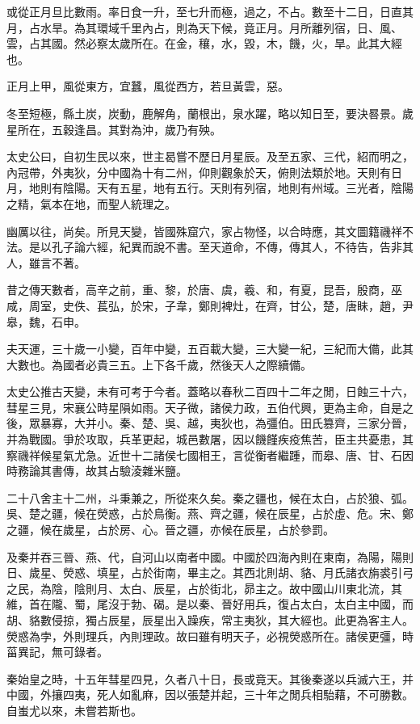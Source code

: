 或從正月旦比數雨。率日食一升，至七升而極，過之，不占。數至十二日，日直其月，占水旱。為其環域千里內占，則為天下候，竟正月。月所離列宿，日、風、雲，占其國。然必察太歲所在。在金，穰，水，毀，木，饑，火，旱。此其大經也。

正月上甲，風從東方，宜蠶，風從西方，若旦黃雲，惡。

冬至短極，縣土炭，炭動，鹿解角，蘭根出，泉水躍，略以知日至，要決晷景。歲星所在，五穀逢昌。其對為沖，歲乃有殃。

太史公曰，自初生民以來，世主曷嘗不歷日月星辰。及至五家、三代，紹而明之，內冠帶，外夷狄，分中國為十有二州，仰則觀象於天，俯則法類於地。天則有日月，地則有陰陽。天有五星，地有五行。天則有列宿，地則有州域。三光者，陰陽之精，氣本在地，而聖人統理之。

幽厲以往，尚矣。所見天變，皆國殊窟穴，家占物怪，以合時應，其文圖籍禨祥不法。是以孔子論六經，紀異而說不書。至天道命，不傳，傳其人，不待告，告非其人，雖言不著。

昔之傳天數者，高辛之前，重、黎，於唐、虞，羲、和，有夏，昆吾，殷商，巫咸，周室，史佚、萇弘，於宋，子韋，鄭則裨灶，在齊，甘公，楚，唐眛，趙，尹皋，魏，石申。

夫天運，三十歲一小變，百年中變，五百載大變，三大變一紀，三紀而大備，此其大數也。為國者必貴三五。上下各千歲，然後天人之際續備。

太史公推古天變，未有可考于今者。蓋略以春秋二百四十二年之閒，日蝕三十六，彗星三見，宋襄公時星隕如雨。天子微，諸侯力政，五伯代興，更為主命，自是之後，眾暴寡，大并小。秦、楚、吳、越，夷狄也，為彊伯。田氏篡齊，三家分晉，并為戰國。爭於攻取，兵革更起，城邑數屠，因以饑饉疾疫焦苦，臣主共憂患，其察禨祥候星氣尤急。近世十二諸侯七國相王，言從衡者繼踵，而皋、唐、甘、石因時務論其書傳，故其占驗淩雜米鹽。

二十八舍主十二州，斗秉兼之，所從來久矣。秦之疆也，候在太白，占於狼、弧。吳、楚之疆，候在熒惑，占於鳥衡。燕、齊之疆，候在辰星，占於虛、危。宋、鄭之疆，候在歲星，占於房、心。晉之疆，亦候在辰星，占於參罰。

及秦并吞三晉、燕、代，自河山以南者中國。中國於四海內則在東南，為陽，陽則日、歲星、熒惑、填星，占於街南，畢主之。其西北則胡、貉、月氏諸衣旃裘引弓之民，為陰，陰則月、太白、辰星，占於街北，昴主之。故中國山川東北流，其維，首在隴、蜀，尾沒于勃、碣。是以秦、晉好用兵，復占太白，太白主中國，而胡、貉數侵掠，獨占辰星，辰星出入躁疾，常主夷狄，其大經也。此更為客主人。熒惑為孛，外則理兵，內則理政。故曰雖有明天子，必視熒惑所在。諸侯更彊，時菑異記，無可錄者。

秦始皇之時，十五年彗星四見，久者八十日，長或竟天。其後秦遂以兵滅六王，并中國，外攘四夷，死人如亂麻，因以張楚并起，三十年之閒兵相駘藉，不可勝數。自蚩尤以來，未嘗若斯也。

